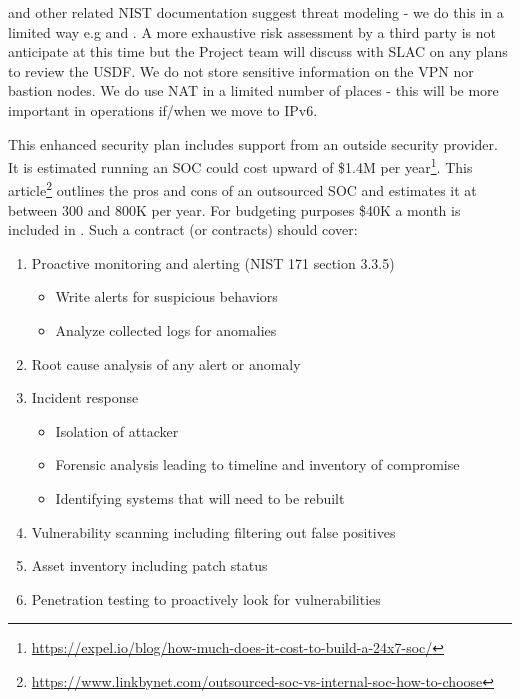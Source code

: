  and other related NIST documentation suggest threat modeling - we do this in a limited way e.g  and . A more exhaustive risk assessment by a third party is not anticipate at this time but the Project team will discuss with SLAC on any plans to review the USDF.
We do not store sensitive information on the VPN nor bastion nodes.
We do use NAT in a limited number of places - this will be more important in operations if/when we move to IPv6.







This enhanced security plan includes support from an outside security provider.
It is estimated running an SOC could cost upward of \$1.4M per year\footnote{\url{https://expel.io/blog/how-much-does-it-cost-to-build-a-24x7-soc/}}.
This article\footnote{\url{https://www.linkbynet.com/outsourced-soc-vs-internal-soc-how-to-choose}} outlines the pros and cons of
an outsourced SOC and estimates it at between 300 and 800K per year.
For budgeting purposes  \$40K a month is included in .
Such a contract (or contracts) should cover:

\begin{enumerate}
\item Proactive monitoring and alerting (NIST 171 section 3.3.5)
  \begin{itemize}
  \item Write alerts for suspicious behaviors
  \item Analyze collected logs for anomalies
  \end{itemize}
\item Root cause analysis of any alert or anomaly
\item Incident response
  \begin{itemize}
  \item Isolation of attacker
  \item Forensic analysis leading to timeline and inventory of compromise
  \item Identifying systems that will need to be rebuilt
  \end{itemize}
\item Vulnerability scanning including filtering out false positives
\item Asset inventory including patch status
\item Penetration testing to proactively look for vulnerabilities
\end{enumerate}


